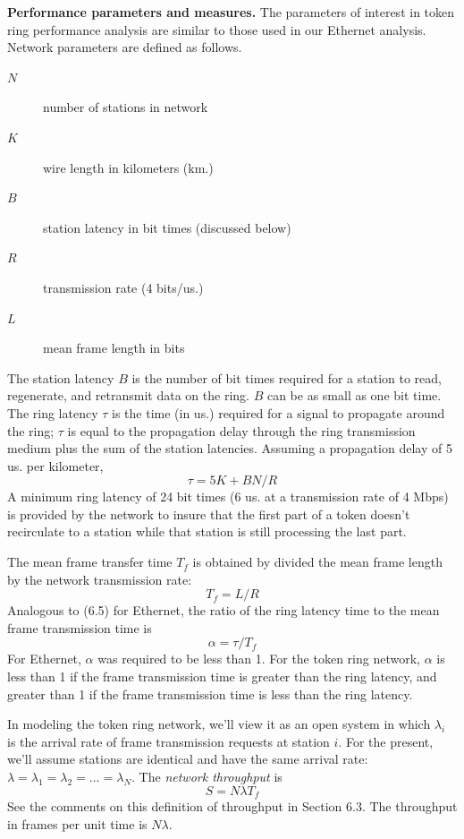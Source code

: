 \noindent\textbf{Performance parameters and measures.} The parameters of interest in token ring performance analysis are similar to those used in our Ethernet analysis. Network parameters are defined as follows.
\begin{description}
\item[$N$] number of stations in network
\item[$K$] wire length in kilometers (km.)
\item[$B$] station latency in bit times (discussed below)
\item[$R$] transmission rate (4 bits/us.)
\item[$L$] mean frame length in bits
\end{description}

The station latency $B$ is the number of bit times required for a station to read, regenerate, and retransmit data on the ring. $B$ can be as small as one bit time. The ring latency $\tau$ is the time (in us.) required for a signal to propagate around the ring; $\tau$ is equal to the propagation delay through the ring transmission medium plus the sum of the station latencies. Assuming a propagation delay of 5 us. per kilometer,
\begin{equation} \tau=5K+BN/R \end{equation}
A minimum ring latency of 24 bit times (6 us. at a transmission rate of 4 Mbps) is provided by the network to insure that the first part of a token doesn't recirculate to a station while that station is still processing the last part.

The mean frame transfer time $T_f$ is obtained by divided the mean frame length by the network transmission rate:
\begin{equation} T_f=L/R \end{equation}
Analogous to (6.5) for Ethernet, the ratio of the ring latency time to the mean frame transmission time is
\begin{equation} \alpha=\tau/T_f \end{equation}
For Ethernet, $\alpha$ was required to be less than 1. For the token ring network, $\alpha$ is less than 1 if the frame transmission time is greater than the ring latency, and greater than 1 if the frame transmission time is less than the ring latency.

In modeling the token ring network, we'll view it as an open system in which $\lambda_i$ is the arrival rate of frame transmission requests at station $i$. For the present, we'll assume stations are identical and have the same arrival rate: $\lambda=\lambda_1=\lambda_2=\ldots=\lambda_N$. The \emph{network throughput} is
\begin{equation} S=N\lambda T_f \end{equation}
See the comments on this definition of throughput in Section 6.3. The throughput in frames per unit time is $N\lambda$.

